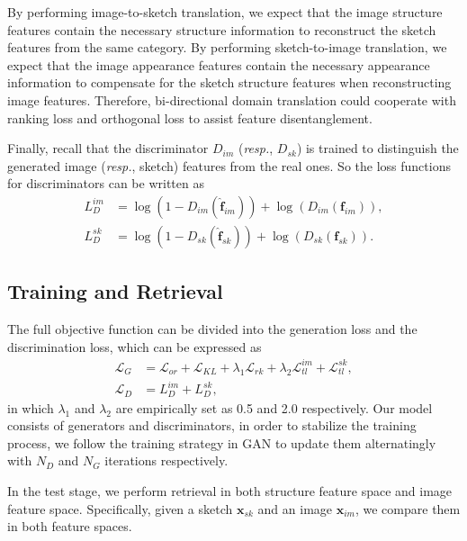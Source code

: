 \documentclass[10pt,twocolumn,letterpaper]{article}
\begin{document}
By performing image-to-sketch translation, we expect that the image structure features contain the necessary structure information to reconstruct the sketch features from the same category. By performing sketch-to-image translation, we expect that the image appearance features contain the necessary appearance information to compensate for the sketch structure features when reconstructing image features. Therefore, bi-directional domain translation could cooperate with ranking loss and orthogonal loss to assist feature disentanglement.

Finally, recall that the discriminator $D_{im}$ (\emph{resp.}, $D_{sk}$) is trained to distinguish the generated image (\emph{resp.}, sketch) features from the real ones. So the loss functions for discriminators can be written as
\vspace{-4pt}
\begin{align}
    L_{D}^{im} &= \log(1\!-\!D_{im}(\hat{\mathbf{f}}_{im})) \!+\! \log(D_{im}(\mathbf{f}_{im})), \\
    L_{D}^{sk} &= \log(1\!-\!D_{sk}(\hat{\mathbf{f}}_{sk})) \!+\! \log(D_{sk}(\mathbf{f}_{sk})).
\end{align}

\subsection{Training and Retrieval} \label{3.3}

The full objective function can be divided into the generation loss and the discrimination loss, which can be expressed as
\vspace{-5pt}
\begin{align} \label{eqn:total_loss}
    \mathcal{L}_{G} \!&=\! \mathcal{L}_{or} \!+\! \mathcal{L}_{KL} \!+\! \lambda_1 \mathcal{L}_{rk} \!+\!  \lambda_2 \mathcal{L}_{tl}^{im} \!+\! \mathcal{L}_{tl}^{sk}, \\
    \mathcal{L}_{D} &= L_{D}^{im} \!+\!  L_{D}^{sk},
\end{align}
in which $\lambda_1$ and $\lambda_2$ are empirically set as 0.5 and 2.0 respectively. 
Our model consists of generators and discriminators, in order to stabilize the training process, we follow the training strategy in GAN \cite{goodfellow2014generative} to update them alternatingly with $N_{D}$ and $N_{G}$ iterations respectively.

In the test stage, we perform retrieval in both structure feature space and image feature space. Specifically, given a sketch $\mathbf{x}_{sk}$ and an image $\mathbf{x}_{im}$, we compare them in both feature spaces.
\end{document}
